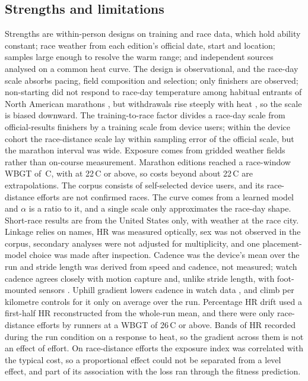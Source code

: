 \documentclass[12pt]{article}
\newcommand{\degC}{\,\textdegree C}
\begin{document}
\subsection{Strengths and limitations}
Strengths are within-person designs on training and race data, which hold ability constant; race weather from each edition's official date, start and location; samples large enough to resolve the warm range; and independent sources analysed on a common heat curve. The design is observational, and the race-day scale absorbs pacing, field composition and selection; only finishers are observed; non-starting did not respond to race-day temperature among habitual entrants of North American marathons \cite{oliveira2026}, but withdrawals rise steeply with heat \cite{roberts2010}, so the scale is biased downward. The training-to-race factor divides a race-day scale from official-results finishers by a training scale from device users; within the device cohort the race-distance scale lay within sampling error of the official scale, but the marathon interval was wide. Exposure comes from gridded weather fields rather than on-course measurement. Marathon editions reached a race-window WBGT of \wbgtMaxMar\degC, with \edMarTwentytwo{} at 22\degC{} or above, so costs beyond about 22\degC{} are extrapolations. The corpus consists of self-selected device users, and its race-distance efforts are not confirmed races. The curve comes from a learned model and $\alpha$ is a ratio to it, and a single scale only approximates the race-day shape. Short-race results are from the United States only, with weather at the race city. Linkage relies on names, HR was measured optically, sex was not observed in the corpus, secondary analyses were not adjusted for multiplicity, and one placement-model choice was made after inspection. Cadence was the device's mean over the run and stride length was derived from speed and cadence, not measured; watch cadence agrees closely with motion capture \cite{adams2016} and, unlike stride length, with foot-mounted sensors \cite{meingast2025}. Uphill gradient lowers cadence in watch data \cite{chan2025}, and climb per kilometre controls for it only on average over the run. Percentage HR drift used a first-half HR reconstructed from the whole-run mean, and there were only \raceBandSevereN{} race-distance efforts by \raceBandSevereRunners{} runners at a WBGT of 26\degC{} or above. Bands of HR recorded during the run condition on a response to heat, so the gradient across them is not an effect of effort. On race-distance efforts the exposure index was correlated with the typical cost, so a proportional effect could not be separated from a level effect, and part of its association with the loss ran through the fitness prediction.
\end{document}
